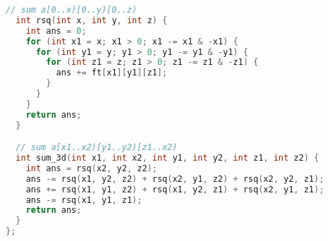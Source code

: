 \documentclass[10pt,a4paper,landscape,twosided]{extarticle}
\begin{document}
\begin{multicols*}{3}
\begin{lstlisting}[language=C++]
  // sum a[0..x)[0..y)[0..z)
  int rsq(int x, int y, int z) {
    int ans = 0;
    for (int x1 = x; x1 > 0; x1 -= x1 & -x1) {
      for (int y1 = y; y1 > 0; y1 -= y1 & -y1) {
        for (int z1 = z; z1 > 0; z1 -= z1 & -z1) {
          ans += ft[x1][y1][z1];
        }
      }
    }
    return ans;
  }

  // sum a[x1..x2)[y1..y2)[z1..x2)
  int sum_3d(int x1, int x2, int y1, int y2, int z1, int z2) {
    int ans = rsq(x2, y2, z2);
    ans -= rsq(x1, y2, z2) + rsq(x2, y1, z2) + rsq(x2, y2, z1);
    ans += rsq(x1, y1, z2) + rsq(x1, y2, z1) + rsq(x2, y1, z1);
    ans -= rsq(x1, y1, z1);
    return ans;
  }
};
\end{lstlisting}


\end{multicols*}
\end{document}
